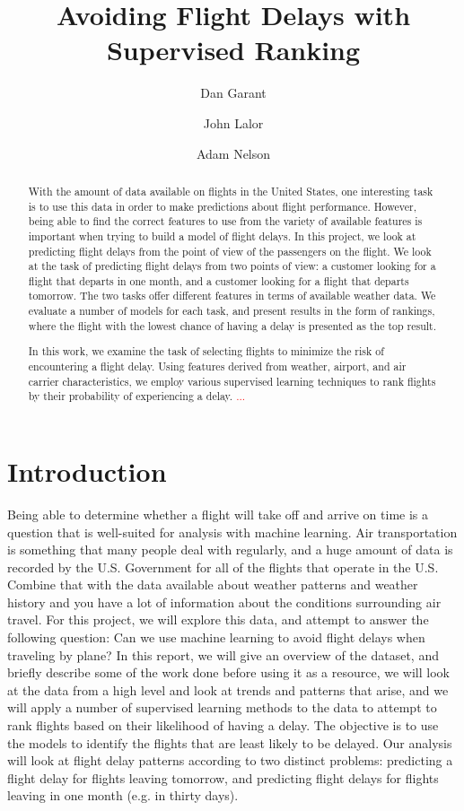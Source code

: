 \documentclass{article}
\title{Avoiding Flight Delays with Supervised Ranking}
\author{Dan Garant \and John Lalor \and Adam Nelson}
\date{}
\begin{document}
\maketitle

\begin{abstract}

With the amount of data available on flights in the United States, one interesting task is to use this data in order to make predictions about flight performance. However, being able to find the correct features to use from the variety of available features is important when trying to build a model of flight delays. In this project, we look at predicting flight delays from the point of view of the passengers on the flight. We look at the task of predicting flight delays from two points of view: a customer looking for a flight that departs in one month, and a customer looking for a flight that departs tomorrow. The two tasks offer different features in terms of available weather data. We evaluate a number of models for each task, and present results in the form of rankings, where the flight with the lowest chance of having a delay is presented as the top result.

In this work, we examine the task of selecting flights to minimize the risk of encountering a flight delay.
Using features derived from weather, airport, and air carrier characteristics, we employ various supervised learning techniques to rank flights by their probability of experiencing a delay.
\textcolor{red}{...}

\end{abstract}

\section{Introduction}

Being able to determine whether a flight will take off and arrive on time is a question that is well-suited for analysis with machine learning. Air transportation is something that many people deal with regularly, and a huge amount of data is recorded by the U.S. Government for all of the flights that operate in the U.S. Combine that with the data available about weather patterns and weather history and you have a lot of information about the conditions surrounding air travel. For this project, we will explore this data, and attempt to answer the following question: Can we use machine learning to avoid flight delays when traveling by plane? In this report, we will give an overview of the dataset, and briefly describe some of the work done before using it as a resource, we will look at the data from a high level and look at trends and patterns that arise, and we will apply a number of supervised learning methods to the data to attempt to rank flights based on their likelihood of having a delay. The objective is to use the models to identify the flights that are least likely to be delayed. Our analysis will look at flight delay patterns according to two distinct problems: predicting a flight delay for flights leaving tomorrow, and predicting flight delays for flights leaving in one month (e.g. in thirty days).
\end{document}
